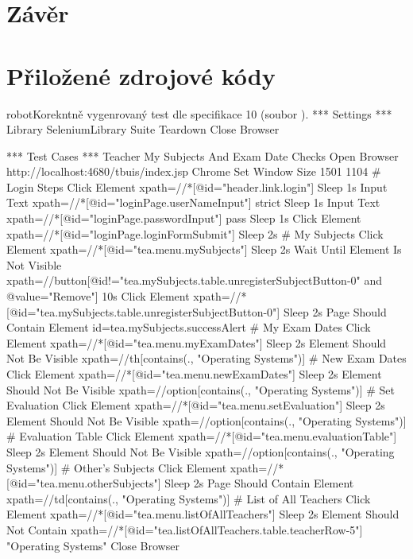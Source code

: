 \documentclass[czech, ma, kiv, he, iso690alph, pdf, viewonly]{fasthesis}
\begin{document}
\chapter{Závěr}

\appendix

    \chapter{Přiložené zdrojové kódy} \label{sec:appendix:src}

    \begin{code}{robot}{Korekntně vygenrovaný test dle specifikace 10 (soubor ). \label{lst:gpt4:spec-10-3}}
*** Settings ***
Library           SeleniumLibrary
Suite Teardown    Close Browser

*** Test Cases ***
Teacher My Subjects And Exam Date Checks
    Open Browser    http://localhost:4680/tbuis/index.jsp    Chrome
    Set Window Size    1501    1104
    # Login Steps
    Click Element    xpath=//*[@id="header.link.login"]
    Sleep    1s
    Input Text    xpath=//*[@id="loginPage.userNameInput"]    strict
    Sleep    1s
    Input Text    xpath=//*[@id="loginPage.passwordInput"]    pass
    Sleep    1s
    Click Element    xpath=//*[@id="loginPage.loginFormSubmit"]
    Sleep    2s
    # My Subjects
    Click Element    xpath=//*[@id="tea.menu.mySubjects"]
    Sleep    2s
    Wait Until Element Is Not Visible    xpath=//button[@id!="tea.mySubjects.table.unregisterSubjectButton-0" and @value="Remove"]    10s
    Click Element    xpath=//*[@id="tea.mySubjects.table.unregisterSubjectButton-0"]
    Sleep    2s
    Page Should Contain Element    id=tea.mySubjects.successAlert
    # My Exam Dates
    Click Element    xpath=//*[@id="tea.menu.myExamDates"]
    Sleep    2s
    Element Should Not Be Visible    xpath=//th[contains(., "Operating Systems")]
    # New Exam Dates
    Click Element    xpath=//*[@id="tea.menu.newExamDates"]
    Sleep    2s
    Element Should Not Be Visible    xpath=//option[contains(., "Operating Systems")]
    # Set Evaluation
    Click Element    xpath=//*[@id="tea.menu.setEvaluation"]
    Sleep    2s
    Element Should Not Be Visible    xpath=//option[contains(., "Operating Systems")]
    # Evaluation Table
    Click Element    xpath=//*[@id="tea.menu.evaluationTable"]
    Sleep    2s
    Element Should Not Be Visible    xpath=//option[contains(., "Operating Systems")]
    # Other's Subjects
    Click Element    xpath=//*[@id="tea.menu.otherSubjects"]
    Sleep    2s
    Page Should Contain Element    xpath=//td[contains(., "Operating Systems")]
    # List of All Teachers
    Click Element    xpath=//*[@id="tea.menu.listOfAllTeachers"]
    Sleep    2s
    Element Should Not Contain    xpath=//*[@id="tea.listOfAllTeachers.table.teacherRow-5"]    "Operating Systems"
    Close Browser


\end{code}
\end{document}
